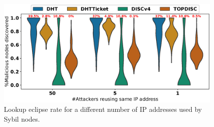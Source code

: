 
\begin{figure}[!h]
\includegraphics[width=\linewidth]{results/security/violin_sybilSize_percentageMaliciousDiscovered_t10.eps}
\caption{Lookup eclipse rate for a different number of IP addresses used by Sybil nodes.}
\label{fig:eclipse_sybil}
\end{figure}

%
%
%








